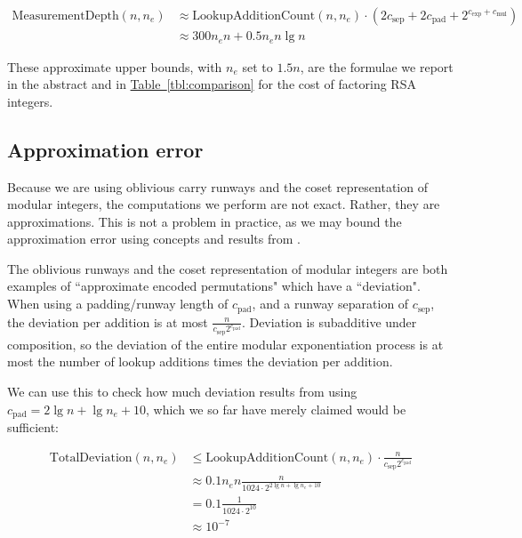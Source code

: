 \documentclass[superscriptaddress,notitlepage,longbibliography]{revtex4-1}
\theoremstyle{definition}
\theoremstyle{definition}
\newcommand{\tbl}[1]{\hyperref[tbl:#1]{Table~\ref*{tbl:#1}}}
\newcommand{\lenexp}{{n_e}}
\newcommand{\gexp}{{c_{\text{exp}}}}
\newcommand{\gmul}{{c_{\text{mul}}}}
\newcommand{\gsep}{{c_{\text{sep}}}}
\newcommand{\gpad}{{c_{\text{pad}}}}
\begin{document}
\begin{equation}
\begin{aligned}
    \text{MeasurementDepth}(n, \lenexp)
    &\approx \text{LookupAdditionCount}(n, \lenexp) \cdot \left(2 \gsep + 2\gpad + 2^{\gexp + \gmul} \right)
    \\&\approx 300 \lenexp n + 0.5 \lenexp n \lg n
\end{aligned}
\end{equation}

These approximate upper bounds, with $\lenexp$ set to $1.5n$, are the formulae we report in the abstract and in \tbl{comparison} for the cost of factoring RSA integers.


\subsection{Approximation error}

Because we are using oblivious carry runways and the coset representation of modular integers, the computations we perform are not exact.
Rather, they are approximations.
This is not a problem in practice, as we may bound the approximation error using concepts and results from \cite{gidney2019approximatepermutation}.

The oblivious runways and the coset representation of modular integers are both examples of ``approximate encoded permutations" which have a ``deviation".
When using a padding/runway length of $\gpad$, and a runway separation of $\gsep$, the deviation per addition is at most $\frac{n}{\gsep 2^{\gpad}}$.
Deviation is subadditive under composition, so the deviation of the entire modular exponentiation process is at most the number of lookup additions times the deviation per addition.

We can use this to check how much deviation results from using $\gpad = 2 \lg n + \lg \lenexp + 10$, which we so far have merely claimed would be sufficient:

\begin{equation}
\begin{aligned}
    \text{TotalDeviation}(n, \lenexp)
    &\leq \text{LookupAdditionCount}(n, \lenexp) \cdot \frac{n}{\gsep 2^{\gpad}}
    \\&\approx 0.1 \lenexp n \frac{n}{1024 \cdot 2^{2 \lg n + \lg \lenexp + 10}}
    \\&= 0.1 \frac{1}{1024 \cdot 2^{10}}
    \\&\approx 10^{-7}
\end{aligned}
\end{equation}
\end{document}
